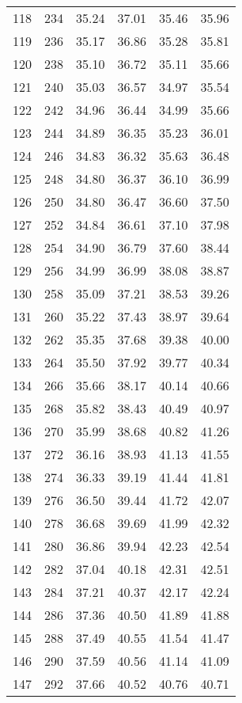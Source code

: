 \begin{longtable}{rrllll}
		118 & 234 & 35.24 & 37.01 & 35.46 & 35.96 \\ 
		119 & 236 & 35.17 & 36.86 & 35.28 & 35.81 \\ 
		120 & 238 & 35.10 & 36.72 & 35.11 & 35.66 \\ 
		121 & 240 & 35.03 & 36.57 & 34.97 & 35.54 \\ 
		122 & 242 & 34.96 & 36.44 & 34.99 & 35.66 \\ 
		123 & 244 & 34.89 & 36.35 & 35.23 & 36.01 \\ 
		124 & 246 & 34.83 & 36.32 & 35.63 & 36.48 \\ 
		125 & 248 & 34.80 & 36.37 & 36.10 & 36.99 \\ 
		126 & 250 & 34.80 & 36.47 & 36.60 & 37.50 \\ 
		127 & 252 & 34.84 & 36.61 & 37.10 & 37.98 \\ 
		128 & 254 & 34.90 & 36.79 & 37.60 & 38.44 \\ 
		129 & 256 & 34.99 & 36.99 & 38.08 & 38.87 \\ 
		130 & 258 & 35.09 & 37.21 & 38.53 & 39.26 \\ 
		131 & 260 & 35.22 & 37.43 & 38.97 & 39.64 \\ 
		132 & 262 & 35.35 & 37.68 & 39.38 & 40.00 \\ 
		133 & 264 & 35.50 & 37.92 & 39.77 & 40.34 \\ 
		134 & 266 & 35.66 & 38.17 & 40.14 & 40.66 \\ 
		135 & 268 & 35.82 & 38.43 & 40.49 & 40.97 \\ 
		136 & 270 & 35.99 & 38.68 & 40.82 & 41.26 \\ 
		137 & 272 & 36.16 & 38.93 & 41.13 & 41.55 \\ 
		138 & 274 & 36.33 & 39.19 & 41.44 & 41.81 \\ 
		139 & 276 & 36.50 & 39.44 & 41.72 & 42.07 \\ 
		140 & 278 & 36.68 & 39.69 & 41.99 & 42.32 \\ 
		141 & 280 & 36.86 & 39.94 & 42.23 & 42.54 \\ 
		142 & 282 & 37.04 & 40.18 & 42.31 & 42.51 \\ 
		143 & 284 & 37.21 & 40.37 & 42.17 & 42.24 \\ 
		144 & 286 & 37.36 & 40.50 & 41.89 & 41.88 \\ 
		145 & 288 & 37.49 & 40.55 & 41.54 & 41.47 \\ 
		146 & 290 & 37.59 & 40.56 & 41.14 & 41.09 \\ 
		147 & 292 & 37.66 & 40.52 & 40.76 & 40.71 \\ 

\end{longtable}
